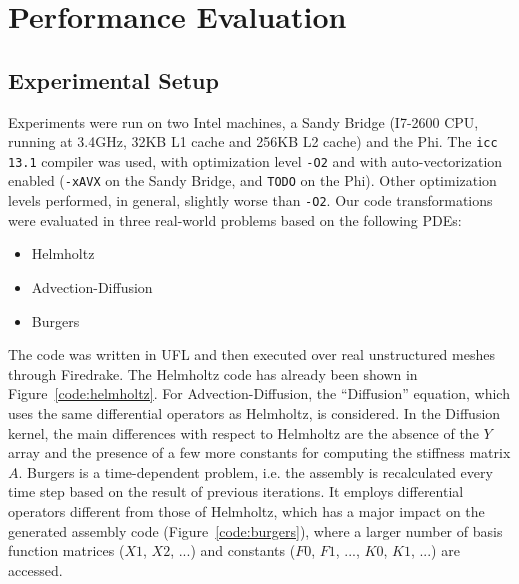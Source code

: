 \documentclass[conference]{IEEEtran}
\begin{document}
\section{Performance Evaluation}
\label{sec:perf-results}

\subsection{Experimental Setup}

Experiments were run on two Intel machines, a Sandy Bridge (I7-2600 CPU, running at 3.4GHz, 32KB L1 cache and 256KB L2 cache) and the Phi. The \texttt{icc 13.1} compiler was used, with optimization level \texttt{-O2} and with auto-vectorization enabled (\texttt{-xAVX} on the Sandy Bridge, and \texttt{TODO} on the Phi). Other optimization levels performed, in general, slightly worse than \texttt{-O2}. Our code transformations were evaluated in three real-world problems based on the following PDEs:
\begin{itemize}
\item Helmholtz
\item Advection-Diffusion
\item Burgers
\end{itemize}
The code was written in UFL and then executed over real unstructured meshes through Firedrake. The Helmholtz code has already been shown in Figure~\ref{code:helmholtz}. For Advection-Diffusion, the ``Diffusion'' equation, which uses the same differential operators as Helmholtz, is considered. In the Diffusion kernel, the main differences with respect to Helmholtz are the absence of the $Y$ array and the presence of a few more constants for computing the stiffness matrix $A$. Burgers is a time-dependent problem, i.e. the assembly is recalculated every time step based on the result of previous iterations. It employs differential operators different from those of Helmholtz, which has a major impact on the generated assembly code (Figure~\ref{code:burgers}), where a larger number of basis function matrices ($X1$, $X2$, ...) and constants ($F0$, $F1$, ..., $K0$, $K1$, ...) are accessed. 
\end{document}
